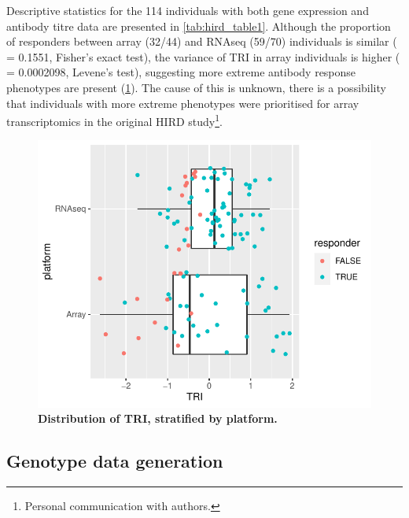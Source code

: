 Descriptive statistics for the 114 individuals with both gene expression and antibody titre data are presented in \cref{tab:hird_table1}.
Although the proportion of responders between array (32/44) and \gls{RNAseq} (59/70) individuals is similar (\pvalue{} = \num{0.1551}, Fisher's exact test), the variance of \gls{TRI} in array individuals is higher (\pvalue{} = \num{0.0002098}, Levene's test), suggesting more extreme antibody response phenotypes are present (\cref{fig:hird_phenotypes_by_platform}).
The cause of this is unknown, there is a possibility that individuals with more extreme phenotypes were prioritised for array transcriptomics in the original \gls{HIRD} study\footnote{Personal communication with \textcite{sobolev2016AdjuvantedInfluenzaH1N1Vaccination} authors.}.



\begin{figure}
    \includegraphics[width=1.0\textwidth,page=1]{mainmatter/figures/chapter_02/compare_phenotype_by_platform.pheno_boxplots.pdf}
    \caption{\textbf{Distribution of \gls{TRI}, stratified by platform.}}
    \label{fig:hird_phenotypes_by_platform}
\end{figure}

\subsection{Genotype data generation}
\label{subsec:hird_dge_genotype_data_generation}

